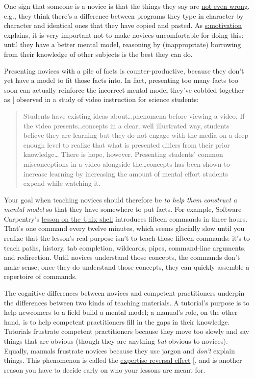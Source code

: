 One sign that someone is a novice is that the things they say are \href{https://en.wikipedia.org/wiki/Not_even_wrong}{not
even wrong}, e.g., they think there's a difference
between programs they type in character by character and identical
ones that they have copied and pasted. As \protect\hyperlink{CHAPTER}{s:motivation}
explains, it is very important not to make novices uncomfortable for
doing this: until they have a better mental model, reasoning by
(inappropriate) borrowing from their knowledge of other subjects is
the best they can do.

Presenting novices with a pile of facts is counter-productive, because
they don't yet have a model to fit those facts into. In fact, presenting
too many facts too soon can actually reinforce the incorrect mental
model they've cobbled together---as {[}\protect[\hyperlink{b:Mull2007a}{Mull2007a}]{]} observed in a
study of video instruction for science students:

\begin{quote}\setlength{\parindent}{0pt}
Students have existing ideas about\ldots{}phenomena before
viewing a video. If the video presents\ldots{}concepts in a
clear, well illustrated way, students believe they are learning but
they do not engage with the media on a deep enough level to realize
that what is presented differs from their prior
knowledge\ldots{} There is hope, however. Presenting students'
common misconceptions in a video alongside the\ldots{}concepts
has been shown to increase learning by increasing the amount of mental
effort students expend while watching it.
\end{quote}

Your goal when teaching novices should therefore be \emph{to help them
construct a mental model} so that they have somewhere to put
facts. For example, Software Carpentry's \href{http://swcarpentry.github.io/shell-novice/}{lesson on the Unix
shell} introduces fifteen commands in three
hours. That's one command every twelve minutes, which seems glacially
slow until you realize that the lesson's real purpose isn't to teach
those fifteen commands: it's to teach paths, history, tab completion,
wildcards, pipes, command-line arguments, and redirection. Until
novices understand those concepts, the commands don't make sense; once
they do understand those concepts, they can quickly assemble a
repertoire of commands.

The cognitive differences between novices and competent practitioners
underpin the differences between two kinds of teaching materials. A
tutorial's purpose is to help newcomers to a field build a mental
model; a manual's role, on the other hand, is to help competent
practitioners fill in the gaps in their knowledge. Tutorials frustrate
competent practitioners because they move too slowly and say things
that are obvious (though they are anything \emph{but} obvious to
novices). Equally, manuals frustrate novices because they use jargon
and \emph{don't} explain things. This phenomenon is called the \protect\hyperlink{g:expertise-reversal}{expertise
reversal effect} {[}\protect[\hyperlink{b:Kaly2003}{Kaly2003}]{]}, and is
another reason you have to decide early on who your lessons are meant
for.

